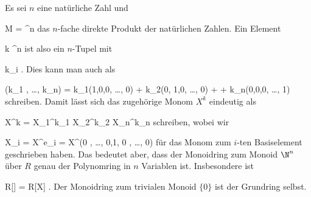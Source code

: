 {





Es sei $n$ eine natürliche Zahl und

\mavergleichskette
{\vergleichskette
{ M
}
{ = }{ \N^n
}
{  }{
}
{    }{
}
{   }{
}
}
{}{}{}
das $n$-fache direkte Produkt der natürlichen Zahlen. Ein Element

\mavergleichskette
{\vergleichskette
{ k
}
{ \in }{ \N^n
}
{  }{
}
{    }{
}
{   }{
}
}
{}{}{}
ist also ein $n$-Tupel
 mit

\mavergleichskette
{\vergleichskette
{ k_i
}
{ \in }{ \N
}
{  }{
}
{    }{
}
{   }{
}
}
{}{}{.}
Dies kann man auch als

\mavergleichskettedisp
{\vergleichskette
{ (k_1 , \ldots ,  k_n)
}
{ =} { k_1(1,0,0, \ldots ,  0) + k_2(0, 1,0, \ldots ,  0) + \cdots +  k_n(0,0,0, \ldots ,  1)
}
{ } {
}
{ } {
}
{ } {
}
}
{}{}{}
schreiben. Damit lässt sich das zugehörige Monom $X^k$ eindeutig  als

\mavergleichskettedisp
{\vergleichskette
{ X^k
}
{ =} { X_1^{k_1 } X_2^{k_2 } \cdots X_n^{k_n }
}
{ } {
}
{ } {
}
{ } {
}
}
{}{}{}
schreiben, wobei wir

\mavergleichskette
{\vergleichskette
{ X_i
}
{ = }{ X^{e_i }
}
{ = }{ X^{(0 , \ldots , 0,1, 0 , \ldots , 0) }
}
{    }{
}
{   }{
}
}
{}{}{}
für das Monom zum $i$-ten Basiselement geschrieben haben. Das bedeutet aber, dass der Monoidring zum Monoid $\N^n$ über $R$ genau der Polynomring in $n$ Variablen ist. Insbesondere ist

\mavergleichskette
{\vergleichskette
{ R[\N]
}
{ = }{ R[X]
}
{  }{
}
{    }{
}
{   }{
}
}
{}{}{.}
Der Monoidring zum trivialen Monoid $\{0\}$ ist der Grundring selbst.





}

